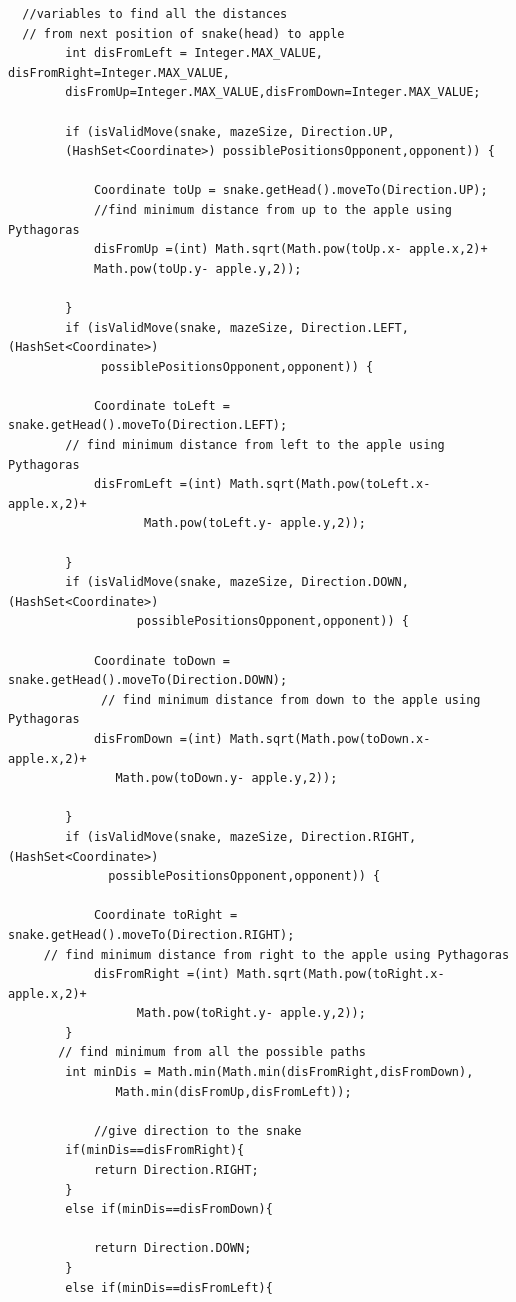 \documentclass[a4paper,12pt]{article}
\begin{document}
\begin{verbatim}
  //variables to find all the distances 
  // from next position of snake(head) to apple
        int disFromLeft = Integer.MAX_VALUE, disFromRight=Integer.MAX_VALUE,
		disFromUp=Integer.MAX_VALUE,disFromDown=Integer.MAX_VALUE;

        if (isValidMove(snake, mazeSize, Direction.UP, 
		(HashSet<Coordinate>) possiblePositionsOpponent,opponent)) {

            Coordinate toUp = snake.getHead().moveTo(Direction.UP);
            //find minimum distance from up to the apple using Pythagoras
            disFromUp =(int) Math.sqrt(Math.pow(toUp.x- apple.x,2)+
			Math.pow(toUp.y- apple.y,2));

        }
        if (isValidMove(snake, mazeSize, Direction.LEFT,(HashSet<Coordinate>) 
		     possiblePositionsOpponent,opponent)) {

            Coordinate toLeft = snake.getHead().moveTo(Direction.LEFT);
        // find minimum distance from left to the apple using Pythagoras
            disFromLeft =(int) Math.sqrt(Math.pow(toLeft.x- apple.x,2)+
			       Math.pow(toLeft.y- apple.y,2));

        }
        if (isValidMove(snake, mazeSize, Direction.DOWN,(HashSet<Coordinate>) 
		          possiblePositionsOpponent,opponent)) {

            Coordinate toDown = snake.getHead().moveTo(Direction.DOWN);
             // find minimum distance from down to the apple using Pythagoras
            disFromDown =(int) Math.sqrt(Math.pow(toDown.x- apple.x,2)+
			   Math.pow(toDown.y- apple.y,2));

        }
        if (isValidMove(snake, mazeSize, Direction.RIGHT,(HashSet<Coordinate>)
		      possiblePositionsOpponent,opponent)) {

            Coordinate toRight = snake.getHead().moveTo(Direction.RIGHT);
     // find minimum distance from right to the apple using Pythagoras
            disFromRight =(int) Math.sqrt(Math.pow(toRight.x- apple.x,2)+
			      Math.pow(toRight.y- apple.y,2));
        }
       // find minimum from all the possible paths
        int minDis = Math.min(Math.min(disFromRight,disFromDown),
		       Math.min(disFromUp,disFromLeft));
            
            //give direction to the snake
        if(minDis==disFromRight){
            return Direction.RIGHT;
        } 
        else if(minDis==disFromDown){

            return Direction.DOWN;
        }
        else if(minDis==disFromLeft){


\end{verbatim}
\end{document}
